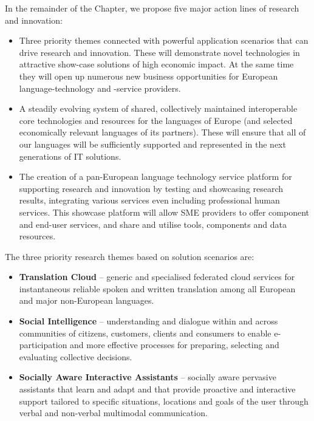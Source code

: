 \documentclass[10pt, plain]{../../metanetpaper}
\begin{document}
\begin{multicols}{2}
In the remainder of the Chapter, we propose five major action lines of research and innovation:

\begin{itemize}
\item Three priority themes connected with powerful application scenarios that can drive research and innovation. These will demonstrate novel technologies in attractive show-case solutions of high economic impact. At the same time they will open up numerous new business opportunities for European language-technology and -service providers.
\item A steadily evolving system of shared, collectively maintained interoperable core technologies and resources for the languages of Europe (and selected economically relevant languages of its partners). These will ensure that all of our languages will be sufficiently supported and represented in the next generations of IT solutions.
\item The creation of a pan-European language technology service platform for supporting research and innovation by testing and showcasing research results, integrating various services even including professional human services. This showcase platform will allow SME providers to offer component and end-user services, and share and utilise tools, components and data resources. 
\end{itemize}

The three priority research themes based on solution scenarios are:

\begin{itemize}
\item \textbf{Translation Cloud} – generic and specialised federated cloud services for instantaneous reliable spoken and written translation among all European and major non-European languages.
\item \textbf{Social Intelligence} – understanding and dialogue within and across communities of citizens, customers, clients and consumers to enable e-participation and more effective processes for preparing, selecting and evaluating collective decisions.
\item \textbf{Socially Aware Interactive Assistants} – socially aware pervasive assistants that learn and adapt and that provide proactive and interactive support tailored to specific situations, locations and goals of the user through verbal and non-verbal multimodal communication.
\end{itemize}


\end{multicols}
\end{document}
